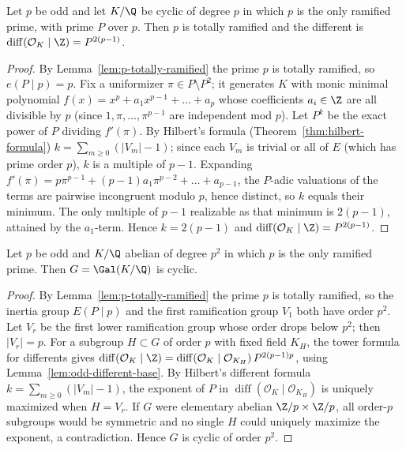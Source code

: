 \begin{lemma}[Different exponent for $m = 1$, odd $p$]
  \label{lem:odd-different-base}
  Let $p$ be odd and let $K/\Q$ be cyclic of degree $p$ in which $p$ is the only
  ramified prime, with prime $P$ over $p$. Then $p$ is totally ramified and the
  different is $\operatorname{diff}(\mathcal{O}_K \mid \Z) = P^{2(p-1)}$.
\end{lemma}
\begin{proof}
  By Lemma~\ref{lem:p-totally-ramified} the prime $p$ is totally ramified, so
  $e(P \mid p) = p$. Fix a uniformizer $\pi \in P \setminus P^2$; it generates
  $K$ with monic minimal polynomial $f(x) = x^p + a_1 x^{p-1} + \dots + a_p$
  whose coefficients $a_i \in \Z$ are all divisible by $p$ (since $1, \pi,
  \dots, \pi^{p-1}$ are independent mod $p$). Let $P^k$ be the exact power of
  $P$ dividing $f'(\pi)$. By Hilbert's formula
  (Theorem~\ref{thm:hilbert-formula}) $k = \sum_{m \ge 0}(|V_m| - 1)$; since
  each $V_m$ is trivial or all of $E$ (which has prime order $p$), $k$ is a
  multiple of $p - 1$. Expanding $f'(\pi) = p\pi^{p-1} + (p-1)a_1 \pi^{p-2} +
  \dots + a_{p-1}$, the $P$-adic valuations of the terms are pairwise
  incongruent modulo $p$, hence distinct, so $k$ equals their minimum. The only
  multiple of $p - 1$ realizable as that minimum is $2(p-1)$, attained by the
  $a_1$-term. Hence $k = 2(p-1)$ and
  $\operatorname{diff}(\mathcal{O}_K \mid \Z) = P^{2(p-1)}$.
\end{proof}

\begin{lemma}
  \label{lem:odd-galois-cyclic}
  Let $p$ be odd and $K/\Q$ abelian of degree $p^2$ in which $p$ is the only
  ramified prime. Then $G = \Gal(K/\Q)$ is cyclic.
\end{lemma}
\begin{proof}
  By Lemma~\ref{lem:p-totally-ramified} the prime $p$ is totally ramified, so
  the inertia group $E(P \mid p)$ and the
  first ramification group $V_1$ both have order $p^2$. Let $V_r$ be the first
  lower ramification group whose order drops below $p^2$; then $|V_r| = p$. For
  a subgroup $H \subset G$ of order $p$ with fixed field $K_H$, the tower
  formula for differents gives $\operatorname{diff}(\mathcal{O}_K \mid \Z) =
  \operatorname{diff}(\mathcal{O}_K \mid \mathcal{O}_{K_H})\, P^{2(p-1)p}$, using
  Lemma~\ref{lem:odd-different-base}. By Hilbert's different formula $k =
  \sum_{m \ge 0}(|V_m| - 1)$, the exponent of $P$ in
  $\operatorname{diff}(\mathcal{O}_K \mid \mathcal{O}_{K_H})$ is uniquely
  maximized when $H = V_r$. If $G$ were elementary abelian $\Z/p \times \Z/p$,
  all order-$p$ subgroups would be symmetric and no single $H$ could uniquely
  maximize the exponent, a contradiction. Hence $G$ is cyclic of order $p^2$.
\end{proof}

